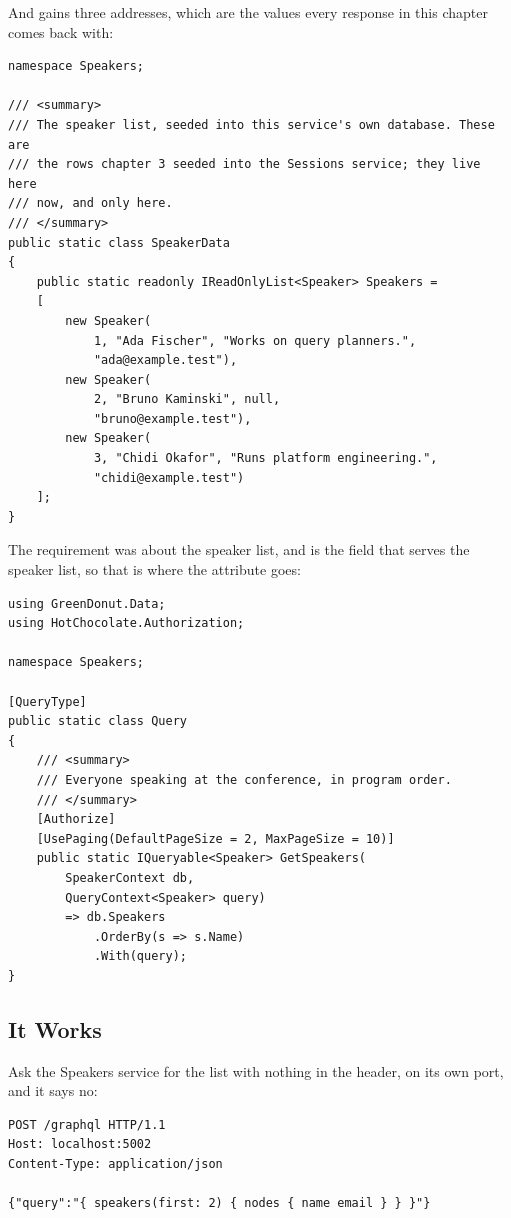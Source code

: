 %
And  gains three addresses, which are the values every
response in this chapter comes back with:

\begin{verbatim}
namespace Speakers;

/// <summary>
/// The speaker list, seeded into this service's own database. These are
/// the rows chapter 3 seeded into the Sessions service; they live here
/// now, and only here.
/// </summary>
public static class SpeakerData
{
    public static readonly IReadOnlyList<Speaker> Speakers =
    [
        new Speaker(
            1, "Ada Fischer", "Works on query planners.",
            "ada@example.test"),
        new Speaker(
            2, "Bruno Kaminski", null,
            "bruno@example.test"),
        new Speaker(
            3, "Chidi Okafor", "Runs platform engineering.",
            "chidi@example.test")
    ];
}
\end{verbatim}

%
The requirement was about the speaker list, and  is the field
that serves the speaker list, so that is where the attribute goes:

\begin{verbatim}
using GreenDonut.Data;
using HotChocolate.Authorization;

namespace Speakers;

[QueryType]
public static class Query
{
    /// <summary>
    /// Everyone speaking at the conference, in program order.
    /// </summary>
    [Authorize]
    [UsePaging(DefaultPageSize = 2, MaxPageSize = 10)]
    public static IQueryable<Speaker> GetSpeakers(
        SpeakerContext db,
        QueryContext<Speaker> query)
        => db.Speakers
            .OrderBy(s => s.Name)
            .With(query);
}
\end{verbatim}

\subsection{It Works}

%
Ask the Speakers service for the list with nothing in the
 header, on its own port, and it says no:

\begin{verbatim}
POST /graphql HTTP/1.1
Host: localhost:5002
Content-Type: application/json

{"query":"{ speakers(first: 2) { nodes { name email } } }"}
\end{verbatim}

